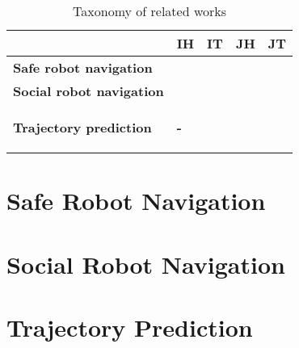 \begin{table}[H]
  \centering
  \begin{tabular}{|p{5cm}|p{1.5cm}|p{1.5cm}|p{1.5cm}|p{1.5cm}|}
    \hline
     & \textbf{IH} & \textbf{IT} & \textbf{JH} & \textbf{JT}\\
    \hline
    \textbf{Safe robot navigation} & \cite{hoeller2007accompanying} & \cite{aoude2013probabilistically}& \cite{trautman2015robot} & \cite{kim2014brvo} \\
    \hline
    \textbf{Social robot navigation} & \cite{kirby2009companion} & \cite{kim2016socially} & \cite{shiomi2014towards} & \cite{kretzschmar2016socially} \\
    \hline
    \textbf{Trajectory prediction} & \begin{center}{\textbf{-}}\end{center} & \cite{joseph2011bayesian, kitani2012activity} & \cite{luber2010people} & \cite{pellegrini2010improving, alahi16} \\
    \hline
  \end{tabular}
  \caption{Taxonomy of related works}
  \label{tab:taxonomy}
\end{table}

\section{Safe Robot Navigation}
\label{sec:safe-robot-navig-1}

\section{Social Robot Navigation}
\label{sec:soci-robot-navig-1}

\section{Trajectory Prediction}
\label{sec:traj-pred-2}



